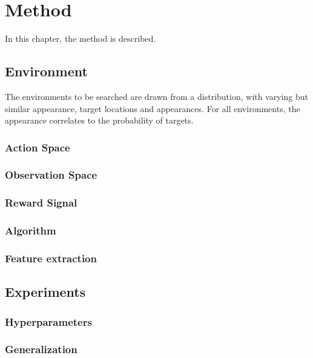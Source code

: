 \chapter{Method}
\label{cha:method}

In this chapter, the method is described.

\section{Environment}

The environments to be searched are drawn from a distribution, with varying but similar appearance, target locations and appearances. For all environments, the appearance correlates to the probability of targets.

\subsection{Action Space}

\subsection{Observation Space}

\subsection{Reward Signal}

\subsection{Algorithm}

\subsection{Feature extraction}

\section{Experiments}

\subsection{Hyperparameters}

\subsection{Generalization}

